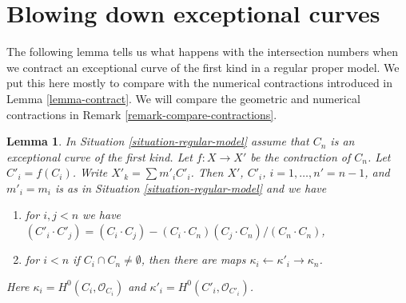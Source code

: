 \documentclass{stacks-project}
\theoremstyle{plain}
\newtheorem{lemma}[subsection]{Lemma}
\theoremstyle{definition}
\theoremstyle{remark}
\numberwithin{equation}{subsection}
\begin{document}
\section{Blowing down exceptional curves}
\label{section-contract}

\noindent
The following lemma tells us what happens with the intersection
numbers when we contract an exceptional curve of the first kind
in a regular proper model. We put this here mostly to compare with
the numerical contractions introduced in Lemma \ref{lemma-contract}.
We will compare the geometric and numerical contractions in
Remark \ref{remark-compare-contractions}.

\begin{lemma}
\label{lemma-blowdown-regular-model}
In Situation \ref{situation-regular-model} assume that $C_n$ is
an exceptional curve of the first kind. Let $f : X \to X'$ be the
contraction of $C_n$. Let $C'_i = f(C_i)$. Write $X'_k = \sum m'_i C'_i$.
Then $X'$, $C'_i$, $i = 1, \ldots, n' = n - 1$, and $m'_i = m_i$
is as in Situation \ref{situation-regular-model} and we have
\begin{enumerate}
\item for $i, j < n$ we have
$(C'_i \cdot C'_j) =
(C_i \cdot C_j) - (C_i \cdot C_n) (C_j \cdot C_n) /(C_n \cdot C_n)$,
\item for $i < n$ if $C_i \cap C_n \not = \emptyset$, then there are
maps $\kappa_i \leftarrow \kappa'_i \rightarrow \kappa_n$.
\end{enumerate}
Here $\kappa_i = H^0(C_i, \mathcal{O}_{C_i})$ and
$\kappa'_i = H^0(C'_i, \mathcal{O}_{C'_i})$.
\end{lemma}
\end{document}
